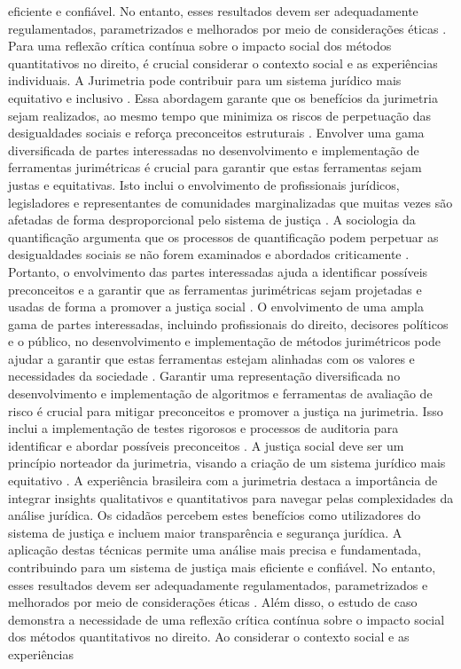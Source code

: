 eficiente e confiável. No entanto, esses resultados devem ser adequadamente regulamentados, parametrizados e melhorados por meio de considerações éticas \cite{101007s1102402209481w}. Para uma reflexão crítica contínua sobre o impacto social dos métodos quantitativos no direito, é crucial considerar o contexto social e as experiências individuais. A Jurimetria pode contribuir para um sistema jurídico mais equitativo e inclusivo \cite{10.1590/dados.2022.65.3.267,10.1057/s41599-020-0396-5}. Essa abordagem garante que os benefícios da jurimetria sejam realizados, ao mesmo tempo que minimiza os riscos de perpetuação das desigualdades sociais e reforça preconceitos estruturais \cite{10.1590/dados.2022.65.3.267,10.1057/s41599-020-0396-5}. Envolver uma gama diversificada de partes interessadas no desenvolvimento e implementação de ferramentas jurimétricas é crucial para garantir que estas ferramentas sejam justas e equitativas. Isto inclui o envolvimento de profissionais jurídicos, legisladores e representantes de comunidades marginalizadas que muitas vezes são afetadas de forma desproporcional pelo sistema de justiça \cite{10.1007/s11186-021-09453-1,1023071190721}. A sociologia da quantificação argumenta que os processos de quantificação podem perpetuar as desigualdades sociais se não forem examinados e abordados criticamente \cite{10.1007/s11186-021-09453-1,1023071190721}. Portanto, o envolvimento das partes interessadas ajuda a identificar possíveis preconceitos e a garantir que as ferramentas jurimétricas sejam projetadas e usadas de forma a promover a justiça social \cite{10.1007/s11186-021-09453-1,1023071190721}. O envolvimento de uma ampla gama de partes interessadas, incluindo profissionais do direito, decisores políticos e o público, no desenvolvimento e implementação de métodos jurimétricos pode ajudar a garantir que estas ferramentas estejam alinhadas com os valores e necessidades da sociedade \cite{unger2021process}. Garantir uma representação diversificada no desenvolvimento e implementação de algoritmos e ferramentas de avaliação de risco é crucial para mitigar preconceitos e promover a justiça na jurimetria. Isso inclui a implementação de testes rigorosos e processos de auditoria para identificar e abordar possíveis preconceitos \cite{10.1590/dados.2022.65.3.267,10.1007/978-3-319-44000-215}. A justiça social deve ser um princípio norteador da jurimetria, visando a criação de um sistema jurídico mais equitativo \cite{10.1590/dados.2022.65.3.267,10.1007/978-3-319-44000-215}. A experiência brasileira com a jurimetria destaca a importância de integrar insights qualitativos e quantitativos para navegar pelas complexidades da análise jurídica. Os cidadãos percebem estes benefícios como utilizadores do sistema de justiça e incluem maior transparência e segurança jurídica. A aplicação destas técnicas permite uma análise mais precisa e fundamentada, contribuindo para um sistema de justiça mais eficiente e confiável. No entanto, esses resultados devem ser adequadamente regulamentados, parametrizados e melhorados por meio de considerações éticas \cite{101007s1102402209481w}. Além disso, o estudo de caso demonstra a necessidade de uma reflexão crítica contínua sobre o impacto social dos métodos quantitativos no direito. Ao considerar o contexto social e as experiências 